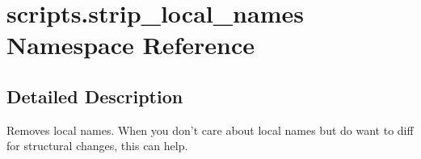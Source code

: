 \hypertarget{namespacescripts_1_1strip__local__names}{}\section{scripts.\+strip\+\_\+local\+\_\+names Namespace Reference}
\label{namespacescripts_1_1strip__local__names}


\subsection{Detailed Description}
\begin{DoxyVerb}Removes local names. When you don't care about local names but do want
to diff for structural changes, this can help.
\end{DoxyVerb}
 